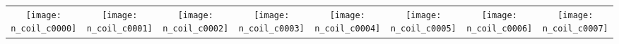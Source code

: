 
\begin{tabular}{c @{\hskip 0pt} c @{\hskip 0pt} c @{\hskip 0pt} c @{\hskip 0pt} c @{\hskip 0pt} c @{\hskip 0pt} c @{\hskip 0pt} c }
    \texttt{[image: n\_coil\_c0000]}&
    \texttt{[image: n\_coil\_c0001]}&
    \texttt{[image: n\_coil\_c0002]}&
    \texttt{[image: n\_coil\_c0003]}&
    \texttt{[image: n\_coil\_c0004]}&
    \texttt{[image: n\_coil\_c0005]}&
    \texttt{[image: n\_coil\_c0006]}&
    \texttt{[image: n\_coil\_c0007]}
\end{tabular}